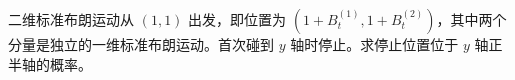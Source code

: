 二维标准布朗运动从 $(1,1)$ 出发，即位置为 $(1+B_t^{(1)},1+B_t^{(2)})$，其中两个分量是独立的一维标准布朗运动。首次碰到 $y$ 轴时停止。求停止位置位于 $y$ 轴正半轴的概率。
